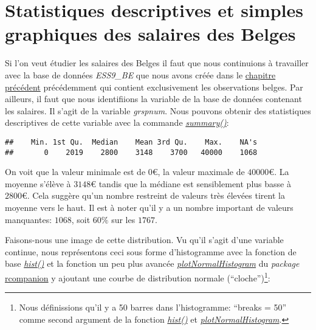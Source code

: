 \documentclass[
]{book}
\newenvironment{Shaded}{\begin{snugshade}}{\end{snugshade}}
\newcommand{\FunctionTok}[1]{\textcolor[rgb]{0.00,0.00,0.00}{#1}}
\newcommand{\NormalTok}[1]{#1}
\newcommand{\SpecialCharTok}[1]{\textcolor[rgb]{0.00,0.00,0.00}{#1}}
\begin{document}
\hypertarget{statistiques-descriptives-et-simples-graphiques-des-salaires-des-belges}{%
\section{Statistiques descriptives et simples graphiques des salaires des Belges}\label{statistiques-descriptives-et-simples-graphiques-des-salaires-des-belges}}

Si l'on veut étudier les salaires des Belges il faut que nous continuions à travailler avec la base de données \emph{ESS9\_BE} que nous avons créée dans le \protect\hyperlink{charge_code_filtrer}{chapitre précédent} précédemment qui contient exclusivement les observations belges. Par ailleurs, il faut que nous identifiions la variable de la base de données contenant les salaires. Il s'agit de la variable \emph{grspnum}. Nous pouvons obtenir des statistiques descriptives de cette variable avec la commande \href{https://www.rdocumentation.org/packages/base/versions/3.6.2/topics/summary}{\emph{summary()}}:

\begin{Shaded}
\end{Shaded}

\begin{verbatim}
##    Min. 1st Qu.  Median    Mean 3rd Qu.    Max.    NA's 
##       0    2019    2800    3148    3700   40000    1068
\end{verbatim}

On voit que la valeur minimale est de \(0€\), la valeur maximale de \(40000€\). La moyenne s'élève à \(3148€\) tandis que la médiane est sensiblement plus basse à \(2800€\). Cela suggère qu'un nombre restreint de valeurs très élevées tirent la moyenne vers le haut. Il est à noter qu'il y a un nombre important de valeurs manquantes: \(1068\), soit \(60\%\) sur les \(1767\).

Faisons-nous une image de cette distribution. Vu qu'il s'agit d'une variable continue, nous représentons ceci sous forme d'histogramme avec la fonction de base \href{https://www.rdocumentation.org/packages/graphics/versions/3.6.2/topics/hist}{\emph{hist()}} et la fonction un peu plus avancée \href{https://www.rdocumentation.org/packages/rcompanion/versions/2.4.21/topics/plotNormalHistogram}{\emph{plotNormalHistogram}} du \emph{package} \href{https://rcompanion.org/handbook/}{rcompanion} y ajoutant une courbe de distribution normale (``cloche'')\footnote{Nous définissions qu'il y a 50 barres dans l'histogramme: ``breaks = 50'' comme second argument de la fonction \href{https://www.rdocumentation.org/packages/graphics/versions/3.6.2/topics/hist}{\emph{hist()}} et \href{https://www.rdocumentation.org/packages/rcompanion/versions/2.4.21/topics/plotNormalHistogram}{\emph{plotNormalHistogram}}.}:
\end{document}
